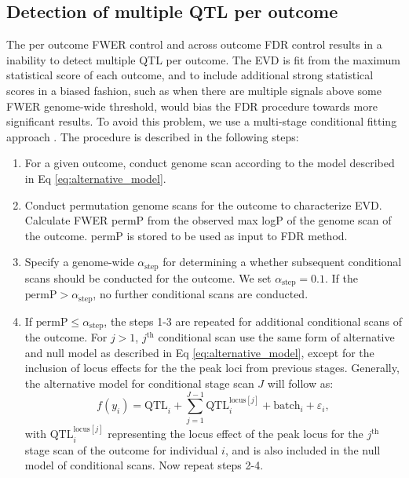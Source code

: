 \subsection{Detection of multiple QTL per outcome}

The per outcome FWER control and across outcome FDR control results in a inability to detect multiple QTL per outcome. The EVD is fit from the maximum statistical score of each outcome, and to include additional strong statistical scores in a biased fashion, such as when there are multiple signals above some FWER genome-wide threshold, would bias the FDR procedure towards more significant results. To avoid this problem, we use a multi-stage conditional fitting approach \citep{Jansen2017}. The procedure is described in the following steps:
\begin{enumerate}
	\item For a given outcome, conduct genome scan according to the model described in Eq \ref{eq:alternative_model}.
    \item Conduct permutation genome scans for the outcome to characterize EVD. Calculate FWER permP from the observed max logP of the genome scan of the outcome. permP is stored to be used as input to FDR method.
    \item Specify a genome-wide $\alpha_{\text{step}}$ for determining a whether subsequent conditional scans should be conducted for the outcome. We set $\alpha_{\text{step}} = 0.1$. If the $\text{permP} > \alpha_{\text{step}}$, no further conditional scans are conducted.
    \item If $\text{permP} \le \alpha_{\text{step}}$, the steps 1-3 are repeated for additional conditional scans of the outcome. For $j > 1$, $j^{\text{th}}$ conditional scan use the same form of alternative and null model as described in Eq \ref{eq:alternative_model}, except for the inclusion of locus effects for the the peak loci from previous stages. Generally, the alternative model for conditional stage scan $J$ will follow as:
\begin{equation}
f(y_{i}) = \text{QTL}_{i} + \sum_{j=1}^{J-1}\text{QTL}_{i}^{\text{locus}[j]} + \text{batch}_{i} + \varepsilon_{i},
\label{eq:conditional_model}
\end{equation}
with $\text{QTL}_{i}^{\text{locus}[j]}$ representing the locus effect of the peak locus for the $j^{\text{th}}$ stage scan of the outcome for individual $i$, and is also included in the null model of conditional scans. Now repeat steps 2-4.
\end{enumerate}

